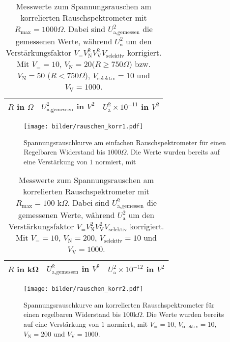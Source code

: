 		\begin{table}[h]
			\centering
			\begin{tabular}{ccc}
				\toprule \midrule
				$R$ in $\Omega$ & $U_\text{a,gemessen}^2$ in $V^2$ 
				& $U_\text{a}^2 \times 10^{-11}$ in $V^2$\\
				\midrule
				
				\midrule \bottomrule
			\end{tabular}
			\caption{Messwerte zum Spannungsrauschen am korrelierten
			Rauschspektrometer mit $R_\text{max}=1000 \Omega$. Dabei sind 
			$U_\text{a,gemessen}^2$ die gemessenen Werte, während $U_\text{a}^2$ um den 
			Verstärkungsfaktor $V_= V_\text{N}^2 V_\text{V}^2 V_\text{selektiv}$ korrigiert. 
			Mit $V_= =10$, $V_\text{N}=20$($R\geq 750\Omega$) bzw. $V_\text{N}=50$
			($R<750\Omega$), $V_\text{selektiv}=10$ und $V_\text{V}=1000$. }
			\label{tab:rauschen_korr1}
	\end{table}
	
	\begin{figure}[h]
			\centering
			\texttt{[image: bilder/rauschen\_korr1.pdf]}
			\caption{Spannungsrauschkurve am einfachen Rauschspektrometer für einen
			Regelbaren Widerstand bis $1000\Omega$. Die Werte wurden bereits auf eine Verstärkung von
			$1$ normiert, mit}
			\label{fig:rauschen_korr1}
	\end{figure}


    
	\begin{table}[h]
			\centering
			\begin{tabular}{ccc}
				\toprule \midrule
				$R$ in \si{\kilo\ohm} & $U_\text{a,gemessen}^2$ in $V^2$ 
				&$U_\text{a}^2 \times 10^{-12}$ in $V^2$ \\
				\midrule
				
				\midrule \bottomrule
			\end{tabular}
			\caption{Messwerte zum Spannungsrauschen am korrelierten
			Rauschspektrometer mit $R_\text{max}=100 \text{ k}\Omega$. Dabei sind 
			$U_\text{a,gemessen}^2$ die gemessenen Werte, während $U_\text{a}^2$ um den 
			Verstärkungsfaktor $V_= V_\text{N}^2 V_\text{V}^2 V_\text{selektiv}$ korrigiert. 
			Mit $V_= =10$, $V_\text{N}=200$, $V_\text{selektiv}=10$ und $V_\text{V}=1000$.}
			\label{tab:rauschen_korr2}
	\end{table}

	\begin{figure}[h]
			\centering
			\texttt{[image: bilder/rauschen\_korr2.pdf]}
			\caption{Spannungsrauschkurve am korrelierten Rauschspektrometer für einen
			regelbaren Widerstand bis $100\text{k}\Omega$. Die Werte wurden bereits auf eine
			Verstärkung von 	$1$ normiert, mit $V_= =10$, $V_\text{selektiv}=10$, $V_\text{N}=200$ und
			$V_\text{V}=1000$. }
			\label{fig:rauschen_korr2}
	\end{figure}

